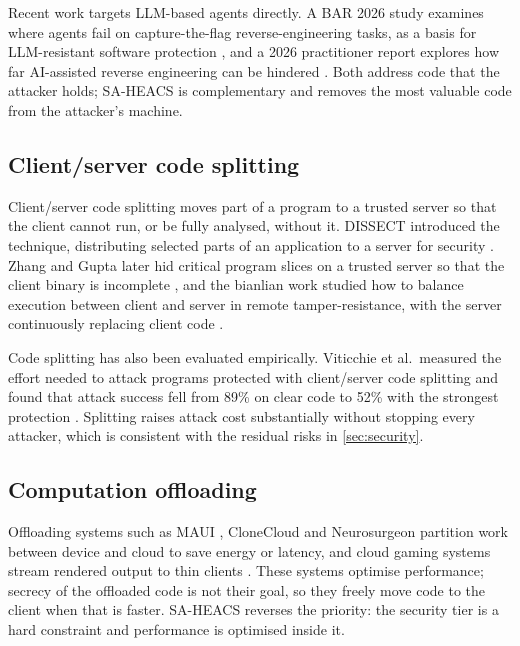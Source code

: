 Recent work targets LLM-based agents directly. A BAR 2026 study examines where agents fail
on capture-the-flag reverse-engineering tasks, as a basis for LLM-resistant software
protection \cite{bar2026llmresistant}, and a 2026 practitioner report explores how far
AI-assisted reverse engineering can be hindered \cite{quarkslab2026defeating}. Both address
code that the attacker holds; SA-HEACS is complementary and removes the most valuable code
from the attacker's machine.

\subsection{Client/server code splitting}
Client/server code splitting moves part of a program to a trusted server so that the
client cannot run, or be fully analysed, without it. DISSECT introduced the technique,
distributing selected parts of an application to a server for security
\cite{valdez2001dissect}. Zhang and Gupta later hid critical program slices on a trusted
server so that the client binary is incomplete \cite{zhang2003hiding}, and the bianlian
work studied how to balance execution between client and server in remote
tamper-resistance, with the server continuously replacing client code
\cite{bianlian2008}.

Code splitting has also been evaluated empirically. Viticchie et al.\ measured the effort
needed to attack programs protected with client/server code splitting and found that
attack success fell from 89\% on clear code to 52\% with the strongest protection
\cite{viticchie_ese_splitting}. Splitting raises attack cost substantially without
stopping every attacker, which is consistent with the residual risks in
\cref{sec:security}.

\subsection{Computation offloading}
Offloading systems such as MAUI
\cite{cuervo2010maui}, CloneCloud \cite{chun2011clonecloud} and Neurosurgeon
\cite{kang2017neurosurgeon} partition work between device and cloud to save energy or
latency, and cloud gaming systems stream rendered output to thin clients
\cite{huang2013gaminganywhere}. These systems optimise performance; secrecy of the offloaded
code is not their goal, so they freely move code to the client when that is faster.
SA-HEACS reverses the priority: the security tier is a hard constraint and performance is
optimised inside it.

